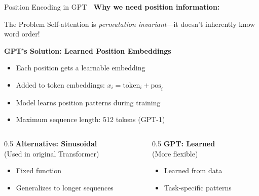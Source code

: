 \documentclass[aspectratio=169]{beamer}
\begin{document}
\begin{frame}[shrink=10]{Position Encoding in GPT 📍}
    \textbf{Why we need position information:}

    \vspace{0.3cm}

    \begin{block}{The Problem}
        Self-attention is \textit{permutation invariant}—it doesn't inherently know word order!
    \end{block}

    \vspace{0.3cm}

    \textbf{GPT's Solution: Learned Position Embeddings}
    \begin{itemize}\setlength{\itemsep}{0pt}
        \item Each position gets a learnable embedding
        \item Added to token embeddings: $x_i = \text{token}_i + \text{pos}_i$
        \item Model learns position patterns during training
        \item Maximum sequence length: 512 tokens (GPT-1)
    \end{itemize}

    \vspace{0.3cm}

    \begin{columns}[T]
        \begin{column}{0.5\textwidth}
            \textbf{Alternative: Sinusoidal} \\
            \small (Used in original Transformer)
            \begin{itemize}\setlength{\itemsep}{0pt}
                \item Fixed function
                \item Generalizes to longer sequences
            \end{itemize}
        \end{column}
        \begin{column}{0.5\textwidth}
            \textbf{GPT: Learned} \\
            \small (More flexible)
            \begin{itemize}\setlength{\itemsep}{0pt}
                \item Learned from data
                \item Task-specific patterns
            \end{itemize}
        \end{column}
    \end{columns}
\end{frame}
\end{document}
